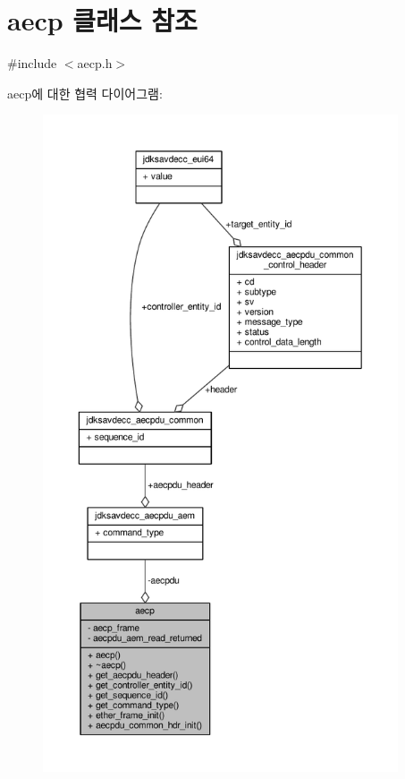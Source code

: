 \hypertarget{classavdecc__lib_1_1aecp}{}\section{aecp 클래스 참조}
\label{classavdecc__lib_1_1aecp}


{\ttfamily \#include $<$aecp.\+h$>$}



aecp에 대한 협력 다이어그램\+:
\nopagebreak
\begin{figure}[H]
\begin{center}
\leavevmode
\includegraphics[height=550pt]{classavdecc__lib_1_1aecp__coll__graph}
\end{center}
\end{figure}
